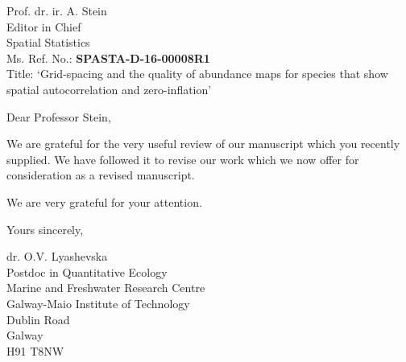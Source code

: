 \documentclass{letter}
\begin{document}
\begin{letter}{
Prof. dr. ir. A. Stein\\
Editor in Chief\\
Spatial Statistics\\
        
\vspace{1cm}
Ms. Ref. No.:  \textbf{SPASTA-D-16-00008R1}\\
Title: `Grid-spacing and the quality of abundance maps for species that show spatial autocorrelation and zero-inflation'
}

\opening{Dear Professor Stein,}

We are grateful for the very useful review of our manuscript which you recently supplied. We have followed it to revise our work which we now offer for consideration as a revised manuscript. 

We are very grateful for your attention.

Yours sincerely, 

dr. O.V. Lyashevska\\
Postdoc in Quantitative Ecology \\
Marine and Freshwater Research Centre\\
Galway-Maio Institute of Technology\\
Dublin Road\\
Galway\\
H91 T8NW

\end{letter}
\end{document}

